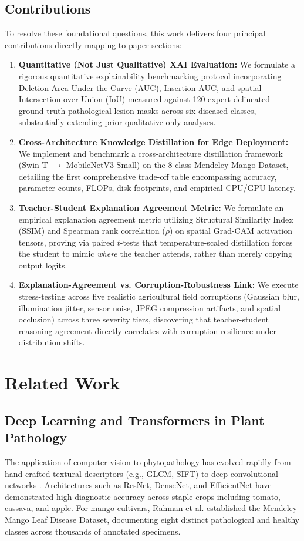 \documentclass[journal,10pt,twocolumn]{article}
\begin{document}
\subsection{Contributions}
\label{sec:contributions}
To resolve these foundational questions, this work delivers four principal contributions directly mapping to paper sections:
\begin{enumerate}
    \item \textbf{Quantitative (Not Just Qualitative) XAI Evaluation:} We formulate a rigorous quantitative explainability benchmarking protocol incorporating Deletion Area Under the Curve (AUC), Insertion AUC, and spatial Intersection-over-Union (IoU) measured against 120 expert-delineated ground-truth pathological lesion masks across six diseased classes, substantially extending prior qualitative-only analyses.
    \item \textbf{Cross-Architecture Knowledge Distillation for Edge Deployment:} We implement and benchmark a cross-architecture distillation framework (Swin-T $\rightarrow$ MobileNetV3-Small) on the 8-class Mendeley Mango Dataset, detailing the first comprehensive trade-off table encompassing accuracy, parameter counts, FLOPs, disk footprints, and empirical CPU/GPU latency.
    \item \textbf{Teacher-Student Explanation Agreement Metric:} We formulate an empirical explanation agreement metric utilizing Structural Similarity Index (SSIM) and Spearman rank correlation ($\rho$) on spatial Grad-CAM activation tensors, proving via paired $t$-tests that temperature-scaled distillation forces the student to mimic \textit{where} the teacher attends, rather than merely copying output logits.
    \item \textbf{Explanation-Agreement vs. Corruption-Robustness Link:} We execute stress-testing across five realistic agricultural field corruptions (Gaussian blur, illumination jitter, sensor noise, JPEG compression artifacts, and spatial occlusion) across three severity tiers, discovering that teacher-student reasoning agreement directly correlates with corruption resilience under distribution shifts.
\end{enumerate}

\section{Related Work}
\label{sec:related_work}

\subsection{Deep Learning and Transformers in Plant Pathology}
The application of computer vision to phytopathology has evolved rapidly from hand-crafted textural descriptors (e.g., GLCM, SIFT) to deep convolutional networks \cite{saleem2019plant, mohanty2016using}. Architectures such as ResNet, DenseNet, and EfficientNet have demonstrated high diagnostic accuracy across staple crops including tomato, cassava, and apple. For mango cultivars, Rahman et al. \cite{rahman2024mango} established the Mendeley Mango Leaf Disease Dataset, documenting eight distinct pathological and healthy classes across thousands of annotated specimens. 
\end{document}

